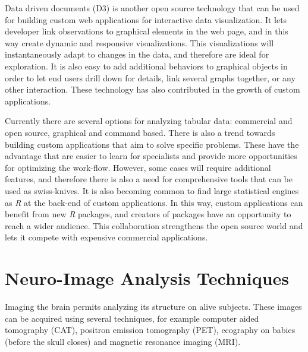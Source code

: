 Data driven documents (D3) \autocite{bostock_d3_2011} is another open source technology that can be used for building custom web applications for interactive data visualization. It lets developer link observations to graphical elements in the web page, and in this way create dynamic and responsive visualizations. This visualizations will instantaneously adapt to changes in the data, and therefore are ideal for exploration. It is also easy to add additional behaviors to graphical objects in order to let end users drill down for details, link several graphs together, or any other interaction. These technology has also contributed in the growth of custom applications.

Currently there are several options for analyzing tabular data: commercial and open source, graphical and command based. There is also a trend towards building custom applications that aim to solve specific problems. These have the advantage that are easier to learn for specialists and provide more opportunities for optimizing the work-flow. However, some cases will require additional features, and therefore there is also a need for comprehensive tools that can be used as swiss-knives. It is also becoming common to find large statistical engines as \emph{R} at the back-end of custom applications. In this way, custom applications can benefit from new \emph{R} packages, and creators of packages have an opportunity to reach a wider audience. This collaboration strengthens the open source world and lets it compete with expensive commercial applications.



\section{Neuro-Image Analysis Techniques}

Imaging the brain permits analyzing its structure on alive subjects. These images can be acquired using several techniques, for example computer aided tomography (CAT), positron emission tomography (PET), ecography on babies (before the skull closes) and magnetic resonance imaging (MRI). 

